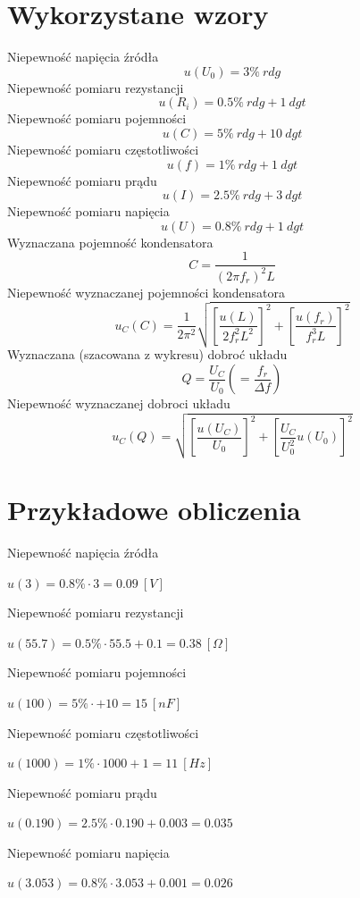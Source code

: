 \documentclass[12pt, a4paper, oneside]{article}
\begin{document}
\section{Wykorzystane wzory}
Niepewność napięcia źródła
\begin{equation}
u(U_0) = 3\%~rdg
\end{equation}
Niepewność pomiaru rezystancji
\begin{equation}
u(R_i) = 0.5\%~rdg + 1~dgt
\end{equation}
Niepewność pomiaru pojemności
\begin{equation}
u(C) = 5\%~rdg + 10~dgt
\end{equation}
Niepewność pomiaru częstotliwości
\begin{equation}
u(f) = 1\%~rdg + 1~dgt
\end{equation}
Niepewność pomiaru prądu
\begin{equation}
u(I) = 2.5\%~rdg + 3~dgt
\end{equation}
Niepewność pomiaru napięcia
\begin{equation}
u(U) = 0.8\%~rdg + 1~dgt
\end{equation}
Wyznaczana pojemność kondensatora
\begin{equation}
C = \frac{1}{(2\pi f_r)^2L}
\end{equation}
Niepewność wyznaczanej pojemności kondensatora
\begin{equation}
u_C(C)=\frac{1}{2\pi^2}\sqrt{[\frac{u(L)}{2f_r^2L^2}]^2+[\frac{u(f_r)}{f_r^3L}]^2}
\end{equation}
Wyznaczana (szacowana z wykresu) dobroć układu
\begin{equation}
Q=\frac{U_C}{U_0}(=\frac{f_r}{\Delta f})
\end{equation}
Niepewność wyznaczanej dobroci układu
\begin{equation}
u_C(Q)=\sqrt{[\frac{u(U_C)}{U_0}]^2+[\frac{U_C}{U_0^2}u(U_0)]^2}
\end{equation}
\section{Przykładowe obliczenia}
Niepewność napięcia źródła
\begin{center}
$u(3) = 0.8\%\cdot3=0.09~[V]$
\end{center}
Niepewność pomiaru rezystancji
\begin{center}
$u(55.7) = 0.5\%\cdot55.5+0.1=0.38~[\Omega]$
\end{center}
Niepewność pomiaru pojemności
\begin{center}
$u(100) = 5\%\cdot + 10=15~[nF]$
\end{center}
Niepewność pomiaru częstotliwości
\begin{center}
$u(1000) = 1\%\cdot 1000 + 1 = 11~[Hz]$
\end{center}
Niepewność pomiaru prądu
\begin{center}
$u(0.190) = 2.5\%\cdot 0.190 + 0.003=0.035$
\end{center}
Niepewność pomiaru napięcia
\begin{center}
$u(3.053) = 0.8\%\cdot3.053+0.001=0.026$
\end{center}
\clearpage
\end{document}
